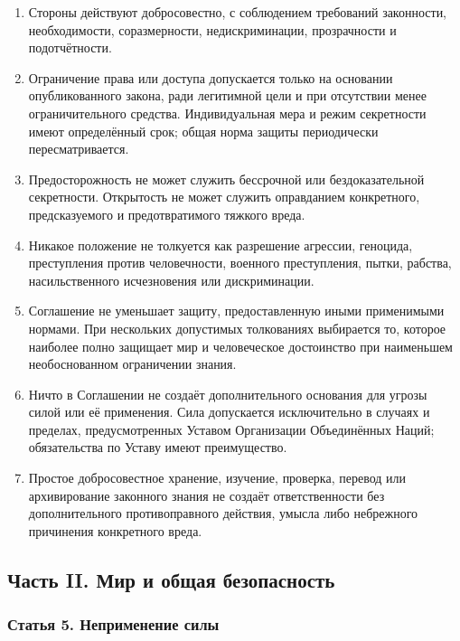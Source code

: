 \documentclass[
  russian,
  11pt,
  a4paper,
]{article}
\providecommand{\tightlist}{%
  \setlength{\itemsep}{0pt}\setlength{\parskip}{0pt}}
\begin{document}
\begin{enumerate}
\def\labelenumi{\arabic{enumi}.}
\tightlist
\item
  Стороны действуют добросовестно, с соблюдением требований законности,
  необходимости, соразмерности, недискриминации, прозрачности и
  подотчётности.
\item
  Ограничение права или доступа допускается только на основании
  опубликованного закона, ради легитимной цели и при отсутствии менее
  ограничительного средства. Индивидуальная мера и режим секретности
  имеют определённый срок; общая норма защиты периодически
  пересматривается.
\item
  Предосторожность не может служить бессрочной или бездоказательной
  секретности. Открытость не может служить оправданием конкретного,
  предсказуемого и предотвратимого тяжкого вреда.
\item
  Никакое положение не толкуется как разрешение агрессии, геноцида,
  преступления против человечности, военного преступления, пытки,
  рабства, насильственного исчезновения или дискриминации.
\item
  Соглашение не уменьшает защиту, предоставленную иными применимыми
  нормами. При нескольких допустимых толкованиях выбирается то, которое
  наиболее полно защищает мир и человеческое достоинство при наименьшем
  необоснованном ограничении знания.
\item
  Ничто в Соглашении не создаёт дополнительного основания для угрозы
  силой или её применения. Сила допускается исключительно в случаях и
  пределах, предусмотренных Уставом Организации Объединённых Наций;
  обязательства по Уставу имеют преимущество.
\item
  Простое добросовестное хранение, изучение, проверка, перевод или
  архивирование законного знания не создаёт ответственности без
  дополнительного противоправного действия, умысла либо небрежного
  причинения конкретного вреда.
\end{enumerate}

\subsection{Часть II. Мир и общая
безопасность}\label{ux447ux430ux441ux442ux44c-ii-ux43cux438ux440-ux438-ux43eux431ux449ux430ux44f-ux431ux435ux437ux43eux43fux430ux441ux43dux43eux441ux442ux44c}

\subsubsection{Статья 5. Неприменение
силы}\label{ux441ux442ux430ux442ux44cux44f-5-ux43dux435ux43fux440ux438ux43cux435ux43dux435ux43dux438ux435-ux441ux438ux43bux44b}
\end{document}
